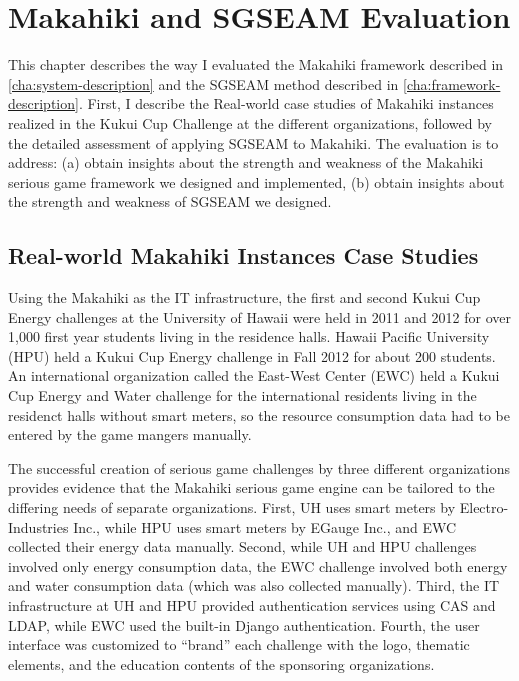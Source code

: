 \chapter{Makahiki and SGSEAM Evaluation}
\label{cha:evaluation}

This chapter describes the way I evaluated the Makahiki framework described in \autoref{cha:system-description} and the SGSEAM method described in \autoref{cha:framework-description}. First, I describe the Real-world case studies of Makahiki instances realized in the Kukui Cup Challenge at the different organizations, followed by the detailed assessment of applying SGSEAM to Makahiki. The evaluation is to address:
(a) obtain insights about the strength and weakness of the Makahiki serious game framework we designed and implemented, (b) obtain insights about the strength and weakness of SGSEAM we designed.

\section{Real-world Makahiki Instances Case Studies}

Using the Makahiki as the IT infrastructure, the first and second Kukui Cup Energy challenges at the University of Hawaii were held in 2011 and 2012 for over 1,000 first year students living in the residence halls. Hawaii Pacific University (HPU) held a Kukui Cup Energy challenge in Fall 2012 for about 200 students. An international organization called the East-West Center (EWC) held a Kukui Cup Energy and Water challenge for the international residents living in the residenct halls without smart meters, so the resource consumption data had to be entered by the game mangers manually.

The successful creation of serious game challenges by three different organizations provides evidence that the Makahiki serious game engine can be tailored to the differing needs of separate organizations. First, UH uses smart meters by Electro-Industries Inc., while HPU uses smart meters by EGauge Inc., and EWC collected their energy data manually. Second, while UH and HPU challenges involved only energy consumption data, the EWC challenge involved both energy and water consumption data (which was also collected manually).  Third, the IT infrastructure at UH and HPU provided authentication services using CAS and LDAP, while EWC used the built-in Django authentication. Fourth, the user interface was customized to ``brand'' each challenge with the logo, thematic elements, and the education contents of the sponsoring organizations.

